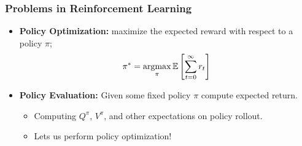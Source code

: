 \begin{frame}
  \frametitle{Problems in Reinforcement Learning}
  \begin{itemize}
    \item \textbf{Policy Optimization:} maximize the expected reward with respect to a policy $\pi$;
    \begin{equation*}
      \pi^* = \mathop{\mathrm{argmax}}_\pi \mathbb{E}\left[\sum_{t=0}^\infty r_t \right]
    \end{equation*}
    \item \textbf{Policy Evaluation:} Given some fixed policy $\pi$ compute expected return.
    \begin{itemize}
      \item Computing $Q^{\pi}$, $V^{\pi}$, and other expectations on policy rollout.
      \item Lets us perform policy optimization!
    \end{itemize}
  \end{itemize}
\end{frame}
